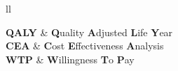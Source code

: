 \documentclass[
11pt, %
english, %
singlespacing, %
openany, %
headsepline, %
]{MastersDoctoralThesis} %
\begin{document}

\tableofcontents %


\mainmatter %

\pagestyle{thesis} %



 



 
% 


\appendix %


%
%
%


\begin{abbreviations}{ll} %
	
	\textbf{QALY} & \textbf{Q}uality \textbf{A}djusted \textbf{L}ife \textbf{Y}ear\\
	\textbf{CEA} & \textbf{C}ost \textbf{E}ffectiveness \textbf{A}nalysis\\
	\textbf{WTP} & \textbf{W}illingness \textbf{T}o \textbf{P}ay\\
	
\end{abbreviations}





\printbibliography[heading=bibintoc]

\end{document}
